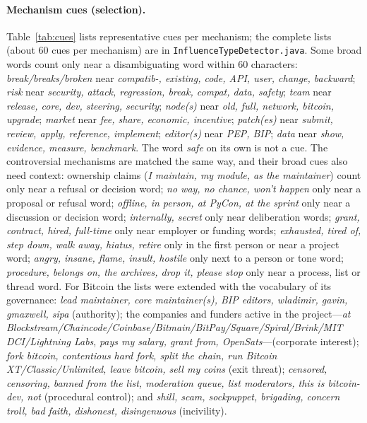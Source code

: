 \documentclass[sigconf,screen]{acmart}
\begin{document}
\paragraph{Mechanism cues (selection).} Table~\ref{tab:cues} lists representative cues per mechanism; the complete lists (about 60 cues per mechanism) are in \texttt{InfluenceTypeDetector.java}. Some broad words count only near a disambiguating word within 60 characters: \emph{break/breaks/broken} near \emph{compatib-, existing, code, API, user, change, backward}; \emph{risk} near \emph{security, attack, regression, break, compat, data, safety}; \emph{team} near \emph{release, core, dev, steering, security}; \emph{node(s)} near \emph{old, full, network, bitcoin, upgrade}; \emph{market} near \emph{fee, share, economic, incentive}; \emph{patch(es)} near \emph{submit, review, apply, reference, implement}; \emph{editor(s)} near \emph{PEP, BIP}; \emph{data} near \emph{show, evidence, measure, benchmark}. The word \emph{safe} on its own is not a cue. The controversial mechanisms are matched the same way, and their broad cues also need context: ownership claims (\emph{I maintain, my module, as the maintainer}) count only near a refusal or decision word; \emph{no way, no chance, won't happen} only near a proposal or refusal word; \emph{offline, in person, at PyCon, at the sprint} only near a discussion or decision word; \emph{internally, secret} only near deliberation words; \emph{grant, contract, hired, full-time} only near employer or funding words; \emph{exhausted, tired of, step down, walk away, hiatus, retire} only in the first person or near a project word; \emph{angry, insane, flame, insult, hostile} only next to a person or tone word; \emph{procedure, belongs on, the archives, drop it, please stop} only near a process, list or thread word. For Bitcoin the lists were extended with the vocabulary of its governance: \emph{lead maintainer, core maintainer(s), BIP editors, wladimir, gavin, gmaxwell, sipa} (authority); the companies and funders active in the project---\emph{at Blockstream/Chaincode/Coinbase/Bitmain/BitPay/Square/Spiral/Brink/MIT DCI/Lightning Labs}, \emph{pays my salary, grant from, OpenSats}---(corporate interest); \emph{fork bitcoin, contentious hard fork, split the chain, run Bitcoin XT/Classic/Unlimited, leave bitcoin, sell my coins} (exit threat); \emph{censored, censoring, banned from the list, moderation queue, list moderators, this is bitcoin-dev, not} (procedural control); and \emph{shill, scam, sockpuppet, brigading, concern troll, bad faith, dishonest, disingenuous} (incivility).
\end{document}
